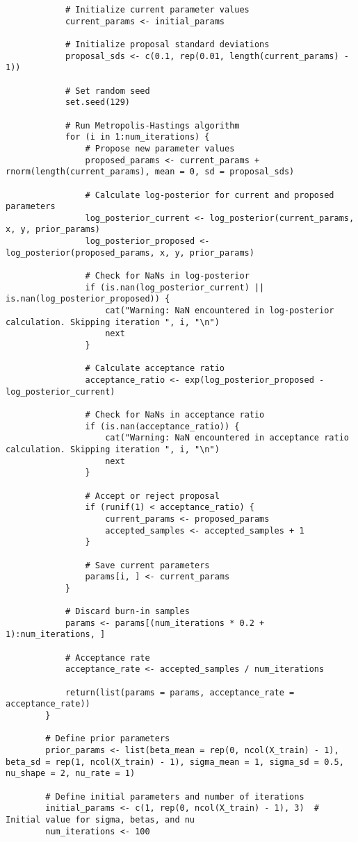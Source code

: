 \documentclass[12pt]{article}
\begin{document}
\begin{lstlisting}
			# Initialize current parameter values
			current_params <- initial_params
			
			# Initialize proposal standard deviations
			proposal_sds <- c(0.1, rep(0.01, length(current_params) - 1))
			
			# Set random seed
			set.seed(129)
			
			# Run Metropolis-Hastings algorithm
			for (i in 1:num_iterations) {
				# Propose new parameter values
				proposed_params <- current_params + rnorm(length(current_params), mean = 0, sd = proposal_sds)
				
				# Calculate log-posterior for current and proposed parameters
				log_posterior_current <- log_posterior(current_params, x, y, prior_params)
				log_posterior_proposed <- log_posterior(proposed_params, x, y, prior_params)
				
				# Check for NaNs in log-posterior
				if (is.nan(log_posterior_current) || is.nan(log_posterior_proposed)) {
					cat("Warning: NaN encountered in log-posterior calculation. Skipping iteration ", i, "\n")
					next
				}
				
				# Calculate acceptance ratio
				acceptance_ratio <- exp(log_posterior_proposed - log_posterior_current)
				
				# Check for NaNs in acceptance ratio
				if (is.nan(acceptance_ratio)) {
					cat("Warning: NaN encountered in acceptance ratio calculation. Skipping iteration ", i, "\n")
					next
				}
				
				# Accept or reject proposal
				if (runif(1) < acceptance_ratio) {
					current_params <- proposed_params
					accepted_samples <- accepted_samples + 1
				}
				
				# Save current parameters
				params[i, ] <- current_params
			}
			
			# Discard burn-in samples
			params <- params[(num_iterations * 0.2 + 1):num_iterations, ]
			
			# Acceptance rate
			acceptance_rate <- accepted_samples / num_iterations
			
			return(list(params = params, acceptance_rate = acceptance_rate))
		}
		
		# Define prior parameters
		prior_params <- list(beta_mean = rep(0, ncol(X_train) - 1), beta_sd = rep(1, ncol(X_train) - 1), sigma_mean = 1, sigma_sd = 0.5, nu_shape = 2, nu_rate = 1)
		
		# Define initial parameters and number of iterations
		initial_params <- c(1, rep(0, ncol(X_train) - 1), 3)  # Initial value for sigma, betas, and nu
		num_iterations <- 100
		

\end{lstlisting}
\end{document}
